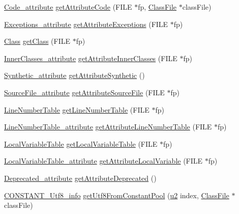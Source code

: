 \begin{DoxyCompactItemize}
\item 
\hyperlink{structCode__attribute}{Code\+\_\+attribute} \hyperlink{classLeitorExibidor_a3ebd90beea3ea327aa7d22b84357c4d0}{get\+Attribute\+Code} (F\+I\+LE $\ast$fp, \hyperlink{classClassFile}{Class\+File} $\ast$class\+File)
\item 
\hyperlink{structExceptions__attribute}{Exceptions\+\_\+attribute} \hyperlink{classLeitorExibidor_a36e7bb07a50754e6236dd555654d9032}{get\+Attribute\+Exceptions} (F\+I\+LE $\ast$fp)
\item 
\hyperlink{structClass}{Class} \hyperlink{classLeitorExibidor_a331d5d793343e29a8180771a4d2aa29c}{get\+Class} (F\+I\+LE $\ast$fp)
\item 
\hyperlink{structInnerClasses__attribute}{Inner\+Classes\+\_\+attribute} \hyperlink{classLeitorExibidor_a466d543f9134cc30ab471b359e19e765}{get\+Attribute\+Inner\+Classes} (F\+I\+LE $\ast$fp)
\item 
\hyperlink{structSynthetic__attribute}{Synthetic\+\_\+attribute} \hyperlink{classLeitorExibidor_a9920aaaab4f9a67647977ffdbfe91b71}{get\+Attribute\+Synthetic} ()
\item 
\hyperlink{structSourceFile__attribute}{Source\+File\+\_\+attribute} \hyperlink{classLeitorExibidor_a265f56dc5c7eb8cfc9471435735c2145}{get\+Attribute\+Source\+File} (F\+I\+LE $\ast$fp)
\item 
\hyperlink{structLineNumberTable}{Line\+Number\+Table} \hyperlink{classLeitorExibidor_ae0197a46804ec6e06829f53439f6c563}{get\+Line\+Number\+Table} (F\+I\+LE $\ast$fp)
\item 
\hyperlink{structLineNumberTable__attribute}{Line\+Number\+Table\+\_\+attribute} \hyperlink{classLeitorExibidor_a3b8b5cdf9d3f583088496091ab3d53c7}{get\+Attribute\+Line\+Number\+Table} (F\+I\+LE $\ast$fp)
\item 
\hyperlink{structLocalVariableTable}{Local\+Variable\+Table} \hyperlink{classLeitorExibidor_a4b4d4ae7d4d68d9b0869cf0141965a43}{get\+Local\+Variable\+Table} (F\+I\+LE $\ast$fp)
\item 
\hyperlink{structLocalVariableTable__attribute}{Local\+Variable\+Table\+\_\+attribute} \hyperlink{classLeitorExibidor_a95ba6c34c4225f737bf0571f065de7aa}{get\+Attribute\+Local\+Variable} (F\+I\+LE $\ast$fp)
\item 
\hyperlink{structDeprecated__attribute}{Deprecated\+\_\+attribute} \hyperlink{classLeitorExibidor_a7e979d1f74f0b8a8a904404f657a84d5}{get\+Attribute\+Deprecated} ()
\item 
\hyperlink{structCONSTANT__Utf8__info}{C\+O\+N\+S\+T\+A\+N\+T\+\_\+\+Utf8\+\_\+info} \hyperlink{classLeitorExibidor_ad3299334f937507986cef571036b93c0}{get\+Utf8\+From\+Constant\+Pool} (\hyperlink{BasicTypes_8h_a732cde1300aafb73b0ea6c2558a7a54f}{u2} index, \hyperlink{classClassFile}{Class\+File} $\ast$class\+File)

\end{DoxyCompactItemize}

